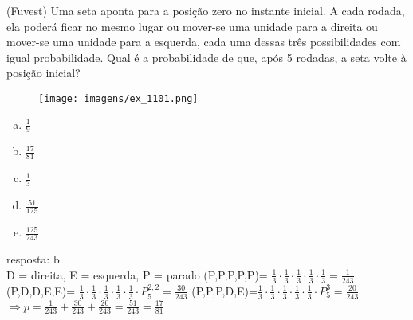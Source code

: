 \begin{ex}
  (Fuvest) Uma seta aponta para a posição zero no instante inicial. A cada rodada, ela poderá ficar no mesmo lugar ou mover-se uma unidade para a direita ou mover-se uma unidade para a esquerda, cada uma dessas três possibilidades com igual probabilidade. Qual é a probabilidade de que, após 5 rodadas, a seta volte à posição inicial?\\
         \begin{figure} [!htb]
             \centering
             \texttt{[image: imagens/ex\_1101.png]}
         \end{figure}
    \begin{enumerate}  [(a)]
        \item $\frac{1}{9}$
        \item $\frac{17}{81}$
        \item $\frac{1}{3}$
        \item $\frac{51}{125}$
        \item $\frac{125}{243}$
    \end{enumerate}
      \begin{sol}
       resposta: b \\
       D = direita, E = esquerda, P = parado \hspace{0,5cm}
       (P,P,P,P,P)=   $\frac{1}{3}\cdot\frac{1}{3}\cdot\frac{1}{3}\cdot\frac{1}{3}\cdot\frac{1}{3}=\frac{1}{243}$\\
       (P,D,D,E,E)= $\frac{1}{3}\cdot\frac{1}{3}\cdot\frac{1}{3}\cdot\frac{1}{3}\cdot\frac{1}{3}\cdot P^{2,2}_5=\frac{30}{243}$\hspace{0,5cm} (P,P,P,D,E)=$\frac{1}{3}\cdot\frac{1}{3}\cdot\frac{1}{3}\cdot\frac{1}{3}\cdot\frac{1}{3}\cdot P^3_5=\frac{20}{243}$\\
       $\Longrightarrow p =\frac{1}{243}+\frac{30}{243}+\frac{20}{243}=\frac{51}{243}=\frac{17}{81}$
      \end{sol}
 \end{ex}